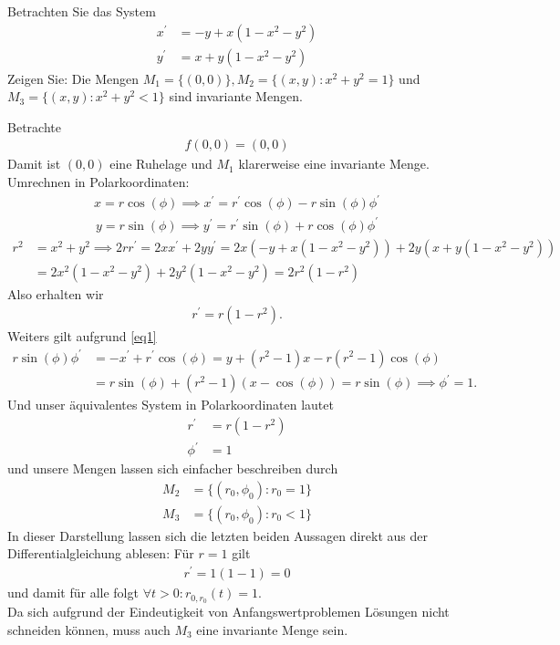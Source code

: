 \begin{exercise}
Betrachten Sie das System
\begin{align*}
  x^{\prime} &= -y + x(1 - x^2 - y^2) \\
  y^{\prime} &= x + y(1 - x^2 - y^2)
\end{align*}
Zeigen Sie: Die Mengen $M_1 = \{(0,0)\}, M_2 = \{(x,y): x^2 + y^2 = 1\}$
und $M_3 = \{(x,y): x^2 + y^2 < 1\}$ sind invariante Mengen.
\end{exercise}
\begin{solution}
Betrachte
\begin{align*}
  f(0,0) = (0,0)
\end{align*}
Damit ist $(0,0)$ eine Ruhelage und $M_1$ klarerweise eine invariante Menge. \\
Umrechnen in Polarkoordinaten:
\begin{align}\label{eq1}
  x = r\cos(\phi) \implies x^{\prime} = r^\prime\cos(\phi)  - r\sin(\phi)\phi^{\prime}
\end{align}
\begin{align*}
  y = r\sin(\phi) \implies y^{\prime} = r^{\prime}\sin(\phi) + r\cos(\phi)\phi^{\prime}
\end{align*}
\begin{align*}
  r^2 &= x^2 + y^2 \implies
  2rr^{\prime} = 2xx^{\prime} + 2yy^{\prime} = 2x(-y + x(1 - x^2 - y^2)) + 2y(x + y(1 - x^2 - y^2)) \\
  &= 2x^2(1 - x^2 - y^2) + 2y^2(1 - x^2 - y^2)
  = 2r^2(1 - r^2)
\end{align*}
Also erhalten wir
\begin{align*}
  r^{\prime} = r(1 - r^2).
\end{align*}
Weiters gilt aufgrund \eqref{eq1}
\begin{align*}
  r \sin(\phi)\phi^{\prime} &= -x^{\prime} + r^{\prime}\cos(\phi) = y + (r^2 - 1)x - r(r^2 - 1)\cos(\phi) \\
  &= r\sin(\phi) + (r^2 - 1)(x-\cos(\phi)) =
  r\sin(\phi) \implies \phi^{\prime} = 1.
\end{align*}
Und unser äquivalentes System in Polarkoordinaten lautet
\begin{align*}
  r^{\prime} &= r(1 - r^2) \\
  \phi^{\prime} &= 1
\end{align*}
und unsere Mengen lassen sich einfacher beschreiben durch
\begin{align*}
  M_2 &= \{(r_0,\phi_0): r_0 = 1\} \\
  M_3 &= \{(r_0,\phi_0): r_0 < 1\}
\end{align*}
In dieser Darstellung lassen sich die letzten beiden Aussagen direkt aus der Differentialgleichung ablesen:
Für $r = 1$ gilt
\begin{align*}
  r^{\prime} = 1(1-1)= 0
\end{align*}
und damit für alle folgt $\forall t > 0: r_{0,r_0}(t) = 1$. \\
Da sich aufgrund der Eindeutigkeit von Anfangswertproblemen Lösungen nicht schneiden
können, muss auch $M_3$ eine invariante Menge sein.
\end{solution}
